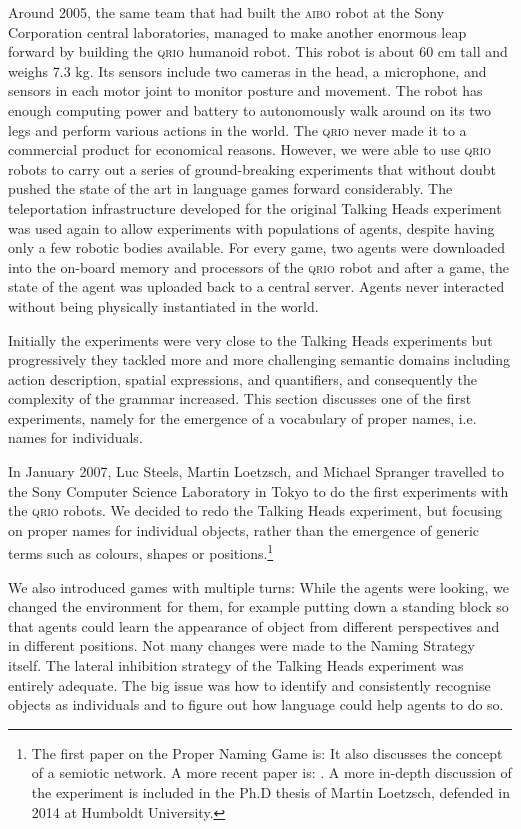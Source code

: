 Around 2005, the same team that had built the \textsc{aibo} robot at the Sony Corporation central laboratories, managed to 
make another enormous leap forward by building 
the \textsc{qrio} humanoid robot. This robot is about 60 cm tall and weighs 7.3 kg. Its sensors
include two cameras in the head, a microphone, and sensors in each motor joint to monitor posture and movement. The robot has enough
computing power and battery to autonomously walk around on its two legs and perform various actions in the world.
The \textsc{qrio} never made it to a commercial product for economical reasons. However, we were able to use \textsc{qrio} robots to 
carry out a series of ground-breaking experiments that without doubt pushed the state of the art in language games
forward considerably. 
The teleportation infrastructure developed for the original Talking Heads experiment was used again 
to allow experiments with populations of agents, despite having only a few robotic bodies available. 
For every game, two agents were downloaded into the on-board memory and processors 
of the \textsc{qrio} robot and after a game, the state of the agent was uploaded back to a central server. Agents never
interacted without being physically instantiated in the world. 

Initially the experiments were very close to the Talking Heads experiments but progressively 
they tackled more and more challenging semantic domains
including action description, spatial expressions, and quantifiers, and consequently
the complexity of the grammar increased. This section discusses one of the first experiments, namely 
for the emergence of a vocabulary of proper names, i.e. names for individuals.

In January 2007, Luc Steels, Martin Loetzsch, and Michael Spranger travelled to the Sony Computer Science Laboratory 
in Tokyo to do the first experiments with the \textsc{qrio} robots.  
We decided to redo the Talking Heads experiment, but focusing on proper names for individual objects, rather than the emergence 
of generic terms such as colours, shapes or positions.\enlargethispage{1\baselineskip}\footnote{The first paper on the Proper Naming Game is: \cite{Steels:2007}
It also discusses the concept of a semiotic network. 
A more recent paper is: \cite{Steels:2012b}. A more 
in-depth discussion of the experiment is included 
in the Ph.D thesis of Martin Loetzsch, defended in 2014 at Humboldt University.}

We also introduced games with multiple turns: While the agents were looking, we 
changed the environment for them, for example putting down a standing block so that 
agents could learn the appearance of object from different perspectives and in different positions. 
Not many changes were made to the Naming Strategy itself. The 
lateral inhibition strategy of the Talking Heads experiment was entirely adequate. The big issue was how to 
identify and consistently recognise objects as individuals and to figure out how language could help agents to do so. 

